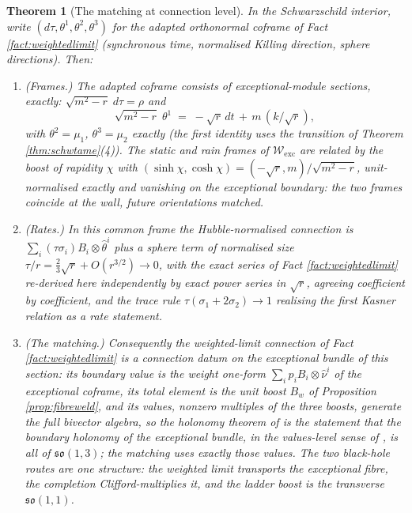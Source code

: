 \documentclass[11pt]{article}
\newtheorem{theorem}{Theorem}[section]
\theoremstyle{definition}
\newcommand{\shW}{\mathcal{W}}
\newcommand{\dtPG}{dt}
\begin{document}
\begin{theorem}[The matching at connection level]\label{thm:connweld}
In the Schwarzschild interior, write $(d\tau, \theta^1, \theta^2, \theta^3)$ for the adapted orthonormal coframe of Fact \ref{fact:weightedlimit} (synchronous time, normalised Killing direction, sphere directions). Then:
\begin{enumerate}
\item \emph{(Frames.)} The adapted coframe consists of exceptional-module sections, exactly: $\sqrt{m^2 - r}\;d\tau = \rho$ and
\[
\sqrt{m^2 - r}\;\theta^1 \;=\; -\sqrt r\,\dtPG \,+\, m\,(k/\sqrt r),
\]
with $\theta^2 = \mu_1$, $\theta^3 = \mu_2$ exactly (the first identity uses the transition of Theorem \ref{thm:schwtame}(4)). The static and rain frames of $\shW_{\mathrm{exc}}$ are related by the boost of rapidity $\chi$ with $(\sinh\chi, \cosh\chi) = (-\sqrt r, m)/\sqrt{m^2-r}$, unit-normalised exactly and vanishing on the exceptional boundary: the two frames coincide at the wall, future orientations matched.
\item \emph{(Rates.)} In this common frame the Hubble-normalised connection is $\sum_i (\tau\sigma_i)B_i \otimes \hat\theta^i$ plus a sphere term of normalised size $\tau/r = \tfrac23\sqrt r + O(r^{3/2}) \to 0$, with the exact series of Fact \ref{fact:weightedlimit} re-derived here independently by exact power series in $\sqrt r$, agreeing coefficient by coefficient, and the trace rule $\tau(\sigma_1 + 2\sigma_2) \to 1$ realising the first Kasner relation as a rate statement.
\item \emph{(The matching.)} Consequently the weighted-limit connection of Fact \ref{fact:weightedlimit} is a connection datum on the exceptional bundle of this section: its boundary value is the weight one-form $\sum_i p_i B_i \otimes \hat\nu^i$ of the exceptional coframe, its total element is the unit boost $B_w$ of Proposition \ref{prop:fibreweld}, and its values, nonzero multiples of the three boosts, generate the full bivector algebra, so the holonomy theorem of \cite{ButlerT6} is the statement that the boundary holonomy of the exceptional bundle, in the values-level sense of \cite[Def.~5.5]{ButlerT6}, is all of $\mathfrak{so}(1,3)$; the matching uses exactly those values. The two black-hole routes are one structure: the weighted limit transports the exceptional fibre, the completion Clifford-multiplies it, and the ladder boost is the transverse $\mathfrak{so}(1,1)$.
\end{enumerate}
\end{theorem}
\end{document}
